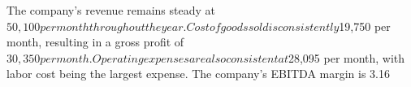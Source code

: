 The company's revenue remains steady at $50,100 per month throughout the year. Cost of goods sold is consistently $19,750 per month, resulting in a gross profit of $30,350 per month. Operating expenses are also consistent at $28,095 per month, with labor cost being the largest expense. The company's EBITDA margin is 3.16%